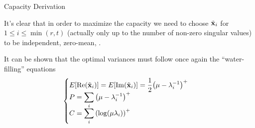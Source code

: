 \begin{frame}[allowframebreaks]{Capacity Derivation}
\framebreak

It's clear that in order to maximize the capacity we need to choose $\tilde{\vb{\vb{x}}}_i$ for $1\leq i \leq \min(r,t)$ (actually only up to the number of non-zero singular values) to be independent, zero-mean, \cscg.

\medskip
It can be shown that the optimal variances must follow once again the \enquote{water-filling} equations
\begin{equation*}
\begin{cases}
\displaystyle E_{}\qty[\Re(\tilde{\vb{\vb{x}}}_i)] = E_{}\qty[\Im(\tilde{\vb{\vb{x}}}_i)] = \frac{1}{2} \qty(\mu-\lambda_i^{-1})^+\\
\displaystyle P = \sum_i \qty(\mu-\lambda_i^{-1})^+\\
\displaystyle C = \sum_i \qty(\log(\mu\lambda_i))^+
\end{cases}
\end{equation*}

\end{frame}

